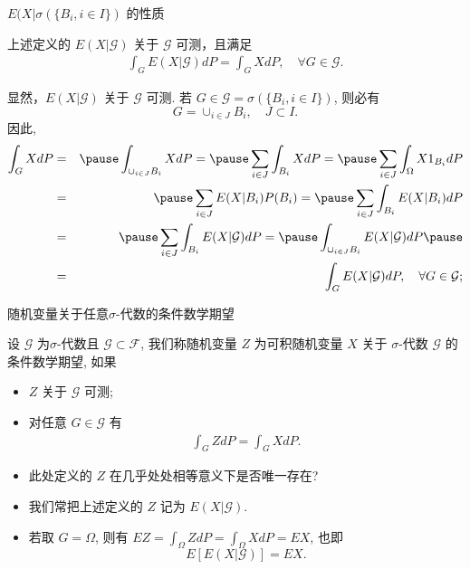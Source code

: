 \documentclass[Prob-All.tex]{subfiles}
\begin{document}
\begin{frame}{ $E(X|\sigma(\{B_i, i\in I\})$ 的性质}

\begin{thm} 上述定义的 $E(X|\mathcal{G})$ 关于 $\mathcal{G}$ 可测，且满足
{\small \begin{eqnarray*}
	\int_G E(X|\mathcal{G})dP=\int_G XdP, \quad \forall G\in \mathcal{G}.
\end{eqnarray*}}
\end{thm}
\pause
\noindent\zheng 显然，$E(X|\mathcal{G})$ 关于 $\mathcal{G}$ 可测.  \pause 若 $G\in \mathcal{G}=\sigma(\{B_i, i\in I\})$, 则必有
 $$G=\cup_{i\in J} B_i, \quad J\subset I.$$
 \pause 因此,
{\small \begin{eqnarray*}
	\int_{G}XdP&=&\pause\int_{\cup_{i\in J} B_i}XdP=\pause\sum_{i\in J}\int_{B_i}XdP=\pause\sum_{i\in J}\int_{\Omega}X1_{B_i}dP\\
	&=& \pause\sum_{i\in J}E(X|B_i)P(B_i) = \pause\sum_{i\in J}\int_{B_i}E(X|B_i)dP\\
	&=&\pause\sum_{i\in J}\int_{B_i}E(X|\mathcal{G})dP=\pause \int_{\cup_{i\in J} B_i} E(X|\mathcal{G})dP\pause\\
	 &=&\int_G E(X|\mathcal{G})dP, \quad \forall G\in \mathcal{G};
\end{eqnarray*}}
\end{frame}

\begin{frame}{随机变量关于任意$\sigma$-代数的条件数学期望}
\begin{defi}
  设 $\mathcal{G}$ 为$\sigma$-代数且 $\mathcal{G}\subset\mathcal{F}$, 我们称随机变量 $Z$ 为可积随机变量 $X$ 关于 $\sigma$-代数 $\mathcal{G}$ 的条件数学期望, 如果
  \begin{itemize}[<+-|alert@+>]
	\item $Z$ 关于 $\mathcal{G}$ 可测;
	\item 对任意 $G\in \mathcal{G}$ 有
	{\small \begin{eqnarray*}
		\int_G ZdP=\int_G XdP.
	\end{eqnarray*}}
  \end{itemize}
\end{defi}
\pause
\vspace{-0.2cm}
\begin{rmk}
\begin{itemize}[<+-|alert@+>]
\item 此处定义的 $Z$ 在几乎处处相等意义下是否唯一存在?
\item 我们常把上述定义的 $Z$ 记为 $E(X|\mathcal{G})$.
\item 若取 $G=\Omega$, 则有 $EZ=\int_{\Omega}ZdP=\int_{\Omega}XdP=EX$, 也即
$$E[E(X|\mathcal{G})]=EX.$$

\end{itemize}

\end{rmk}

\end{frame}
\end{document}
